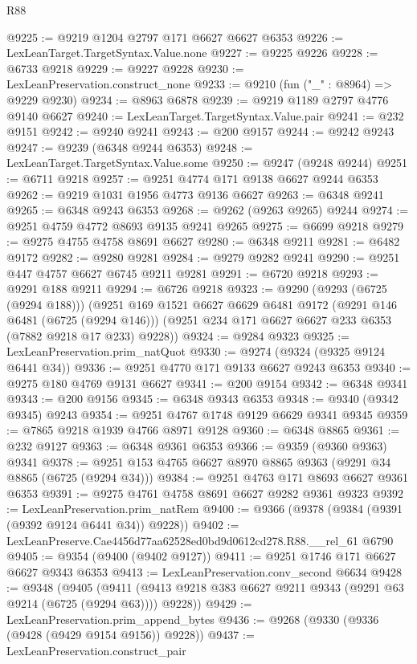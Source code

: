 \begin{lexlean}{R88}
\begin{coremodule}
@9225 := @9219 @1204 @2797 @171 @6627 @6627 @6353
@9226 := LexLeanTarget.TargetSyntax.Value.none
@9227 := @9225 @9226
@9228 := @6733 @9218
@9229 := @9227 @9228
@9230 := LexLeanPreservation.construct_none
@9233 := @9210 (fun ("_" : @8964) => @9229 @9230)
@9234 := @8963 @6878
@9239 := @9219 @1189 @2797 @4776 @9140 @6627
@9240 := LexLeanTarget.TargetSyntax.Value.pair
@9241 := @232 @9151
@9242 := @9240 @9241
@9243 := @200 @9157
@9244 := @9242 @9243
@9247 := @9239 (@6348 @9244 @6353)
@9248 := LexLeanTarget.TargetSyntax.Value.some
@9250 := @9247 (@9248 @9244)
@9251 := @6711 @9218
@9257 := @9251 @4774 @171 @9138 @6627 @9244 @6353
@9262 := @9219 @1031 @1956 @4773 @9136 @6627
@9263 := @6348 @9241
@9265 := @6348 @9243 @6353
@9268 := @9262 (@9263 @9265) @9244
@9274 := @9251 @4759 @4772 @8693 @9135 @9241 @9265
@9275 := @6699 @9218
@9279 := @9275 @4755 @4758 @8691 @6627
@9280 := @6348 @9211
@9281 := @6482 @9172
@9282 := @9280 @9281
@9284 := @9279 @9282 @9241
@9290 := @9251 @447 @4757 @6627 @6745 @9211 @9281
@9291 := @6720 @9218
@9293 := @9291 @188 @9211
@9294 := @6726 @9218
@9323 := @9290
    (@9293 (@6725 (@9294 @188)))
    (@9251
      @169
      @1521
      @6627
      @6629
      @6481
      @9172
      (@9291 @146 @6481 (@6725 (@9294 @146)))
      (@9251 @234 @171 @6627 @6627 @233 @6353 (@7882 @9218 @17 @233) @9228))
@9324 := @9284 @9323
@9325 := LexLeanPreservation.prim_natQuot
@9330 := @9274 (@9324 (@9325 @9124 @6441 @34))
@9336 := @9251 @4770 @171 @9133 @6627 @9243 @6353
@9340 := @9275 @180 @4769 @9131 @6627
@9341 := @200 @9154
@9342 := @6348 @9341
@9343 := @200 @9156
@9345 := @6348 @9343 @6353
@9348 := @9340 (@9342 @9345) @9243
@9354 := @9251 @4767 @1748 @9129 @6629 @9341 @9345
@9359 := @7865 @9218 @1939 @4766 @8971 @9128
@9360 := @6348 @8865
@9361 := @232 @9127
@9363 := @6348 @9361 @6353
@9366 := @9359 (@9360 @9363) @9341
@9378 := @9251 @153 @4765 @6627 @8970 @8865 @9363 (@9291 @34 @8865 (@6725 (@9294 @34)))
@9384 := @9251 @4763 @171 @8693 @6627 @9361 @6353
@9391 := @9275 @4761 @4758 @8691 @6627 @9282 @9361 @9323
@9392 := LexLeanPreservation.prim_natRem
@9400 := @9366 (@9378 (@9384 (@9391 (@9392 @9124 @6441 @34)) @9228))
@9402 := LexLeanPreserve.Cae4456d77aa62528ed0bd9d0612cd278.R88.__rel_61 @6790
@9405 := @9354 (@9400 (@9402 @9127))
@9411 := @9251 @1746 @171 @6627 @6627 @9343 @6353
@9413 := LexLeanPreservation.conv_second @6634
@9428 := @9348
    (@9405 (@9411 (@9413 @9218 @383 @6627 @9211 @9343 (@9291 @63 @9214 (@6725 (@9294 @63)))) @9228))
@9429 := LexLeanPreservation.prim_append_bytes
@9436 := @9268 (@9330 (@9336 (@9428 (@9429 @9154 @9156)) @9228))
@9437 := LexLeanPreservation.construct_pair

\end{coremodule}
\end{lexlean}
